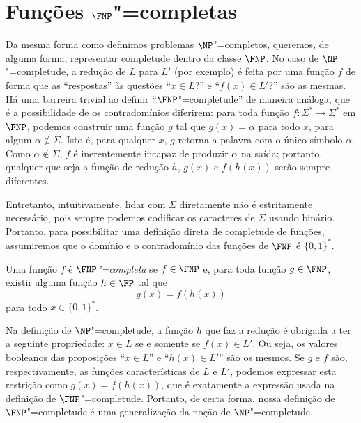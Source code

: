 \section{Funções $\FNP$"=completas}
\label{sec:fnp_complete}

Da mesma forma como definimos problemas $\NP$"=completos,
queremos, de alguma forma,
representar completude dentro da classe $\FNP$.
No caso de $\NP$"=completude,
a redução de $L$ para $L'$ (por exemplo)
é feita por uma função $f$ de forma que
as ``respostas'' às questões ``$x \in L$?'' e ``$f(x) \in L'$?'' são as mesmas.
Há uma barreira trivial ao definir ``$\FNP$"=completude'' de maneira análoga,
que é a possibilidade de os contradomínios diferirem:
para toda função $f: \Sigma^* \to \Sigma^*$ em $\FNP$,
podemos construir uma função $g$ tal que $g(x) = \alpha$ para todo $x$,
para algum $\alpha \notin \Sigma$.
Isto é, para qualquer $x$, $g$ retorna a palavra com o único símbolo $\alpha$.
Como $\alpha \notin \Sigma$,
$f$ é inerentemente incapaz de produzir $\alpha$ na saída;
portanto, qualquer que seja a função de redução $h$,
$g(x)$ e $f(h(x))$ serão sempre diferentes.

Entretanto, intuitivamente,
lidar com $\Sigma$ diretamente não é estritamente necessário,
pois sempre podemos codificar os caracteres de $\Sigma$ usando binário.
Portanto,
para possibilitar uma definição direta de completude de funções,
assumiremos que o domínio e o contradomínio das funções de $\FNP$
é $\{0, 1\}^*$.

\begin{definition}
    Uma função $f$ é \emph{$\FNP$"=completa}
    se $f \in \FNP$ e,
    para toda função $g \in \FNP$,
    existir alguma função $h \in \FP$ tal que
    \begin{equation*}
        g(x) = f(h(x))
    \end{equation*}
    para todo $x \in \{0, 1\}^*$.
\end{definition}

Na definição de $\NP$"=completude,
a função $h$ que faz a redução é obrigada a ter a seguinte propriedade:
$x \in L$ se e somente se $f(x) \in L'$.
Ou seja, os valores booleanos das proposições
``$x \in L$'' e ``$h(x) \in L'$'' são os mesmos.
Se $g$ e $f$ são, respectivamente,
as funções características de $L$ e $L'$,
podemos expressar esta restrição como
$g(x) = f(h(x))$,
que é exatamente a expressão usada na definição de $\FNP$"=completude.
Portanto, de certa forma,
nossa definição de $\FNP$"=completude
é uma generalização da noção de $\NP$"=completude.


